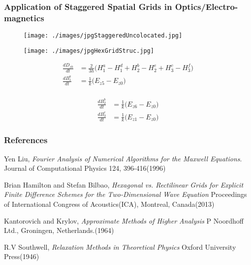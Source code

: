\documentclass{beamer}
\begin{document}
\begin{frame}
\frametitle{Application of Staggered Spatial Grids in Optics/Electro-magnetics}
\tiny
\begin{figure}
\centering
\begin{minipage}{.5\textwidth}
  \centering
\texttt{[image: ./images/jpgStaggeredUncolocated.jpg]}
\label{fig:StaggeredColocated}
\end{minipage}%
\begin{minipage}{.5\textwidth}
  \centering
\texttt{[image: ./images/jpgHexGridStruc.jpg]}
\end{minipage}
\end{figure}

\begin{minipage}{.5\textwidth}
  \centering
\begin{align*}
\frac{d D_{z0}}{dt} &= \frac{2}{3h} \big( H^a_1 - H^d_1 + H^b_2 - H^e_2 + H^c_3 - H^f_3 \big)\\
\frac{d B^a_1}{dt} &= \frac{1}{k} \big(E_{z5} - E_{z0} \big)\\
\end{align*}
\end{minipage}%
\begin{minipage}{.5\textwidth}
  \centering
\begin{align*}
\frac{d B^b_2}{dt}&= \frac{1}{k}\big( E_{z6} - E_{z0}\big)\\
\frac{d B^c_3}{dt}&= \frac{1}{k}\big( E_{z1} - E_{z0} \big)
\end{align*}
\end{minipage}

\end{frame}

\begin{frame}
\frametitle{References}
\begin{thebibliography}{9}

Yen Liu,
  \emph{Fourier Analysis of Numerical Algorithms for the Maxwell Equations}.
Journal of Computational Physics 124, 396-416(1996)

Brian Hamilton and Stefan Bilbao,
\emph{Hexagonal vs. Rectilinear Grids for Explicit Finite Difference Schemes for the Two-Dimensional Wave Equation}
Proceedings of International Congress of Acoustics(ICA), Montreal, Canada(2013)

Kantorovich and Krylov,
\emph{Approximate Methods of Higher Analysis} P Noordhoff Ltd., Groningen, Netherlands.(1964)

R.V Southwell, \emph{Relaxation Methods in Theoretical Physics} Oxford University Press(1946)

\end{thebibliography}
\end{frame}




\end{document}
